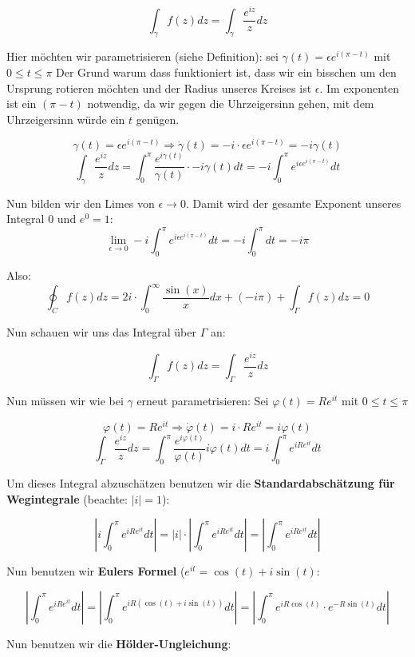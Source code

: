 \documentclass[12pt]{amsart}
\begin{document}
$$\int_\gamma f(z) dz = \int_\gamma \frac{e^{iz}}{z} dz$$

Hier möchten wir parametrisieren (siehe Definition): sei $\gamma(t) = \epsilon e^{i(\pi - t)}$ mit $ 0 \leq t \leq \pi$ Der Grund warum dass funktioniert ist, dass wir ein bisschen um den Ursprung rotieren möchten und der Radius unseres Kreises ist $\epsilon$. Im exponenten ist ein $(\pi -t)$ notwendig, da wir gegen die Uhrzeigersinn gehen, mit dem Uhrzeigersinn würde ein $t$ genügen. 

$$\gamma(t) = \epsilon e^{i(\pi - t)} \Rightarrow \dot{\gamma}(t) = -i \cdot \epsilon e^{i(\pi - t)} = -i \gamma(t)$$
$$\int_\gamma \frac{e^{iz}}{z} dz = \int_0^\pi \frac{e^{i\gamma(t)}}{\gamma(t)} \cdot -i\gamma(t) dt = -i \int_0^\pi e^{i\epsilon e^{i(\pi - t)}} dt$$

Nun bilden wir den Limes von $\epsilon \to 0$. Damit wird der gesamte Exponent unseres Integral $0$ und $e^0 = 1$:
$$\lim_{\epsilon \to 0} -i \int_0^\pi e^{i\epsilon e^{i(\pi - t)}} dt = -i \int_0^\pi dt = -i\pi$$

Also: $$\oint_{C}f(z) dz = 2i \cdot \int_0^\infty \frac{\sin{(x)}}{x} dx + (-i\pi) + \int_\Gamma f(z) dz = 0$$

Nun schauen wir uns das Integral über $\Gamma$ an: 

$$\int_\Gamma f(z) dz = \int_\Gamma \frac{e^{iz}}{z} dz$$

Nun müssen wir wie bei $\gamma$ erneut parametrisieren: Sei $\varphi(t) = Re^{it}$ mit $0 \leq t \leq \pi$ 

$$\varphi(t) = Re^{it} \Rightarrow \dot{\varphi}(t) = i\cdot Re^{it} = i \varphi(t)$$
$$\int_\Gamma \frac{e^{iz}}{z} dz = \int_0^\pi \frac{e^{i\varphi(t)}}{\varphi(t)} i \varphi(t) dt = i \int_0^\pi e^{iRe^{it}} dt$$

Um dieses Integral abzuschätzen benutzen wir die \textbf{Standardabschätzung für Wegintegrale} (beachte: $|i| = 1$):

$$\left|i \int_0^\pi e^{iRe^{it}} dt\right| = |i| \cdot \left| \int_0^\pi e^{iRe^{it}} dt\right| = \left| \int_0^\pi e^{iRe^{it}} dt\right|$$

Nun benutzen wir \textbf{Eulers Formel} ($e^{it} = \cos{(t)} + i\sin{(t)}$: 

$$\left| \int_0^\pi e^{iRe^{it}} dt\right| = \left| \int_0^\pi e^{iR(\cos{(t)} + i\sin{(t)})} dt\right| = \left| \int_0^\pi e^{iR\cos{(t)}} \cdot e^{-R\sin{(t)}} dt\right| $$

Nun benutzen wir die \textbf{Hölder-Ungleichung}:
\end{document}
